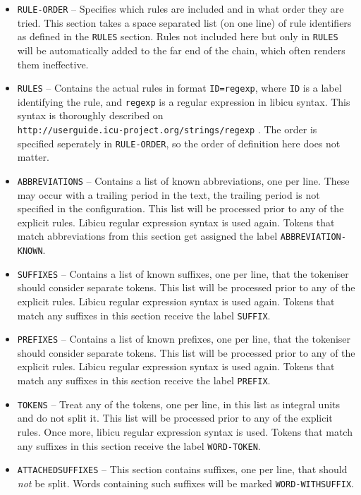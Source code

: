 \documentclass[a4paper,12pt]{report}
\begin{document}
\begin{itemize}
\item \texttt{RULE-ORDER} -- Specifies which rules are included and in what order they are tried. This section takes a space separated list (on one line) of rule identifiers as defined in the \texttt{RULES} section. Rules not included here but only in \texttt{RULES} will be automatically added to the far end of the chain, which often renders them ineffective.
\item \texttt{RULES} -- Contains the actual rules in format \texttt{ID=regexp}, where \texttt{ID} is a label identifying the rule, and \texttt{regexp} is a regular expression in libicu syntax. This syntax is thoroughly described on \\ \texttt{http://userguide.icu-project.org/strings/regexp} . The order is specified seperately in \texttt{RULE-ORDER}, so the order of definition here does not matter.
\item \texttt{ABBREVIATIONS} -- Contains a list of known abbreviations, one per line. These may occur with a trailing period in the text, the trailing period is not specified in the configuration. This list will be processed prior to any of the explicit rules. Libicu regular expression syntax is used again. Tokens that match abbreviations from this section get assigned the label \texttt{ABBREVIATION-KNOWN}.
\item \texttt{SUFFIXES} -- Contains a list of known suffixes, one per line, that the tokeniser should consider separate tokens.  This list will be processed prior to any of the explicit rules. Libicu regular expression syntax is used again. Tokens that match any suffixes in this section receive the label \texttt{SUFFIX}.
\item \texttt{PREFIXES} -- Contains a list of known prefixes, one per line, that the tokeniser should consider separate tokens.  This list will be processed prior to any of the explicit rules. Libicu regular expression syntax is used again. Tokens that match any suffixes in this section receive the label \texttt{PREFIX}.
\item \texttt{TOKENS} -- Treat any of the tokens, one per line, in this list as integral units and do not split it. This list will be processed prior to any of the explicit rules. Once more, libicu regular expression syntax is used. Tokens that match any suffixes in this section receive the label \texttt{WORD-TOKEN}.
\item \texttt{ATTACHEDSUFFIXES} -- This section contains suffixes, one per line, that should \emph{not} be split. Words containing such suffixes will be marked \texttt{WORD-WITHSUFFIX}.

\end{itemize}
\end{document}
